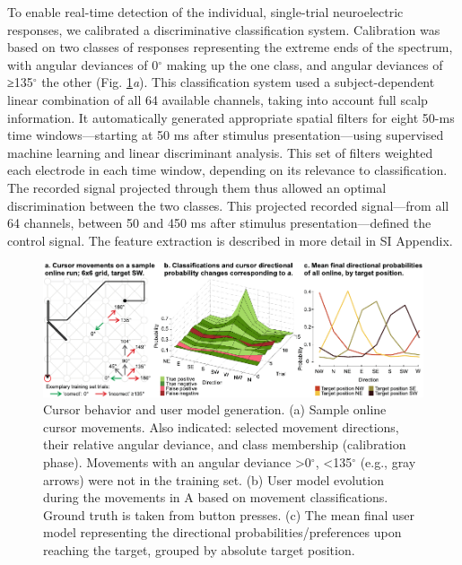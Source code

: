 To enable real-time detection of the individual, single-trial neuroelectric responses, we calibrated a discriminative classification system. Calibration was based on two classes of responses representing the extreme ends of the spectrum, with angular deviances of 0$^{\circ}$ making up the one class, and angular deviances of ≥135$^{\circ}$ the other (Fig. \ref{fig:nat:figure2}\emph{a}). This classification system used a subject-dependent linear combination of all 64 available channels, taking into account full scalp information. It automatically generated appropriate spatial filters for eight 50-ms time windows---starting at 50 ms after stimulus presentation---using supervised machine learning and linear discriminant analysis. This set of filters weighted each electrode in each time window, depending on its relevance to classification. The recorded signal projected through them thus allowed an optimal discrimination between the two classes. This projected recorded signal---from all 64 channels, between 50 and 450 ms after stimulus presentation---defined the control signal. The feature extraction is described in more detail in SI Appendix.


\begin{figure}[ht]
    \centering
    \includegraphics[width=\textwidth]{figures/nat-figure2.pdf}
    \caption[Cursor behavior and user model generation.]{Cursor behavior and user model generation. (a) Sample online cursor movements. Also indicated: selected movement directions, their relative angular deviance, and class membership (calibration phase). Movements with an angular deviance >0$^{\circ}$, <135$^{\circ}$ (e.g., gray arrows) were not in the training set. (b) User model evolution during the movements in A based on movement classifications. Ground truth is taken from button presses. (c) The mean final user model representing the directional probabilities/preferences upon reaching the target, grouped by absolute target position.}
    \label{fig:nat:figure2}
\end{figure}


